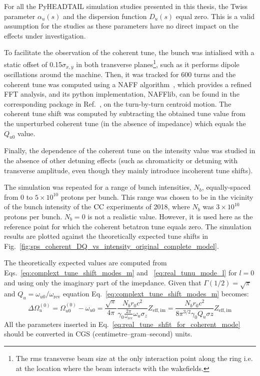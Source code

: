For all the PyHEADTAIL simulation studies presented in this thesis, the Twiss parameter $\alpha_u(s)$ and the dispersion function $D_u(s)$ equal zero. This is a valid assumption for the studies as these parameters have no direct impact on the effects under investigation.

To facilitate the observation of the coherent tune, the bunch was intialised with a static offset of 0.15$\sigma_{x,y}$ in both transverse planes\footnote{The rms transverse beam size at the only interaction point along the ring i.e. at the location where the beam interacts with the wakefields.}, such as it performs dipole oscillations around the machine. Then, it was tracked for 600 turns and the coherent tune was computed using a NAFF algorithm~\cite{LASKAR1990266, Kostoglou:2289645}, which provides a refined FFT analysis, and its python implementation, NAFFlib, can be found in the corresponding package in Ref.~\cite{nafflib_repository}, on the turn-by-turn centroid motion. The coherent tune shift was computed by subtracting the obtained tune value from the unperturbed coherent tune (in the absence of impedance) which equals the $Q_{u0}$ value.


Finally, the dependence of the coherent tune on the intensity value was studied in the absence of other detuning effects (such as chromaticity or detuning with transverse amplitude, even though they mainly introduce incoherent tune shifts). %

The simulation was repeated for a range of bunch intensities, $N_b$, equally-spaced from 0 to $5 \times 10^{10}$ protons per bunch. This range was chosen to be in the vicinity of the bunch intensity of the ${\mathrm{CC}}$ experiments of 2018, where $N_b$ was $3\times 10^{10}$ protons per bunch. $N_b=0$ is not a realistic value. However, it is used here as the reference point for which the coherent betatron tune equals zero. The simulation results are plotted against the theoretically expected tune shifts in Fig.~\ref{fig:sps_coherent_DQ_vs_intensity_original_complete_model}.

The theoretically expected values are computed from Eqs.~\eqref{eq:complext_tune_shift_modes_m} and ~\eqref{eq:real_tunu_mode_l} for $l=0$ and using only the imaginary part of the imepdance. Given that $\Gamma(1/2)=\sqrt{\pi}$ and $Q_u = \omega_{u0}/\omega_\mathrm{rev}$ equation Eq.~\eqref{eq:complext_tune_shift_modes_m} becomes:
\begin{equation}\label{eq:real_tune_shfit_for_coherent_mode}
    \Delta \Omega_u^{(0)} =  \Omega_{u0}^{(0)} - \omega_{u0} = \frac{\sqrt{\pi}}{4 \pi}\frac{N_b r_0 c^2}{\gamma_0 \frac{2\pi}{\omega_\mathrm{rev}}\omega_u \sigma_z} Z_\mathrm{eff, im} = \frac{N_b r_0 c^2}{8 \pi^{3/2} \gamma_0 Q_u \sigma z}Z_\mathrm{eff, im}
\end{equation}
All the parameters inserted in Eq.~\eqref{eq:real_tune_shfit_for_coherent_mode} should be converted in CGS (centimetre–gram–second) units.


